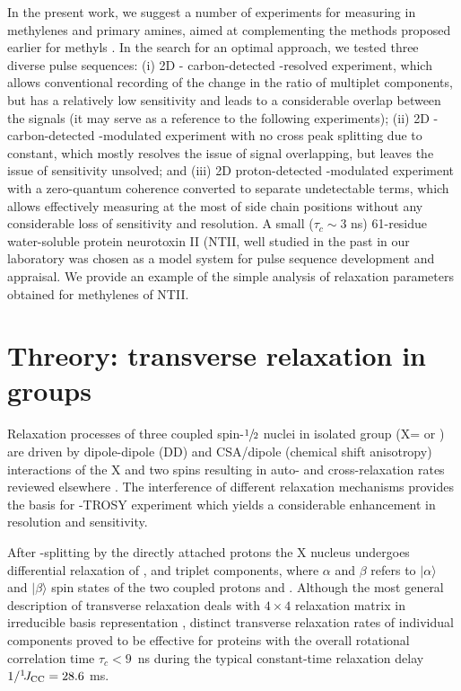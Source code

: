 \documentclass[twocolumn]{svjour3}           %
\begin{document}
In the present work, we suggest a number of experiments for measuring 
\gtwoXH{} in methylenes and primary amines, aimed at complementing the
methods proposed earlier for methyls 
\cite{zhang_probing_2006,lesovoy_nmr_2017}. 
In the search for an optimal approach, we tested three diverse pulse 
sequences: 
(i) 2D \hlab-\clab{} carbon-detected \oneJch-resolved experiment, 
which allows conventional recording of the change in the ratio of multiplet components, but has a relatively low sensitivity and leads to a considerable overlap between the signals (it may serve as a reference to the following experiments); 
(ii) 2D \hlab-\clab{} carbon-detected \oneJch-modulated experiment with 
no cross peak splitting due to \oneJch{} constant, which mostly resolves 
the issue of signal overlapping, but leaves the issue of sensitivity 
unsolved; and 
(iii) 2D proton-detected \oneJch-modulated experiment with a zero-quantum coherence converted to separate undetectable terms, 
which allows effectively measuring 
\gtwoXH{} at the most of side chain \XHtwo{} positions without any 
considerable loss of sensitivity and resolution. 
A small ($\tau_c \sim 3$ 
ns) 61-residue water-soluble protein neurotoxin II (NTII, well studied in the past 
in our laboratory 
\cite{lesovoy_specific_2009,bocharov_resonance_2003,krabben_loop_2009}
was chosen 
as a model system for pulse sequence development and appraisal. We provide an example of the simple analysis of relaxation parameters \gtwoCH{} obtained for methylenes of NTII.

\section{Threory: transverse relaxation in \XHtwo{} groups}
\label{sec:theory}


Relaxation processes of three coupled spin-$\sfrac{1}{2}$ nuclei in isolated 
\XHtwo{} group (X=\nlab{} or \clab{}) are driven by dipole-dipole (DD) and 
CSA\slash dipole (chemical shift ani\-so\-tro\-py) interactions of the X and 
two \hlab{} spins resulting in 
auto- and cross-relaxation rates reviewed elsewhere 
\cite{kumar_cross-correlations_2000,zheng_measurement_2004}. 
The interference of different relaxation mechanisms provides the basis for
\CHtwo-{TROSY} experiment \cite{miclet_relaxation-optimized_2004} which 
yields a considerable enhancement in resolution and sensitivity.

After \oneJxh-splitting by the directly 
attached protons the X nucleus undergoes differential relaxation of  
,  and  triplet components, where $\alpha$ and $\beta$
refers to $|\alpha\rangle$ and $|\beta\rangle$ spin states of the two coupled
protons \Hfirst{} and \Hprime{}.
Although the most general description of transverse relaxation deals with $4\times 4$ 
relaxation matrix in irreducible basis representation 
\cite{kay_heteronuclear_1992,prestegard_characterization_1978},
distinct transverse relaxation rates of individual components proved
to be effective \cite{zheng_measurement_2004} for proteins with the 
overall rotational correlation time $\tau_c < 9$~ns during the typical 
constant-time relaxation delay $1/^1\!J_{\text{CC}} = 28.6$ ms.
\end{document}
